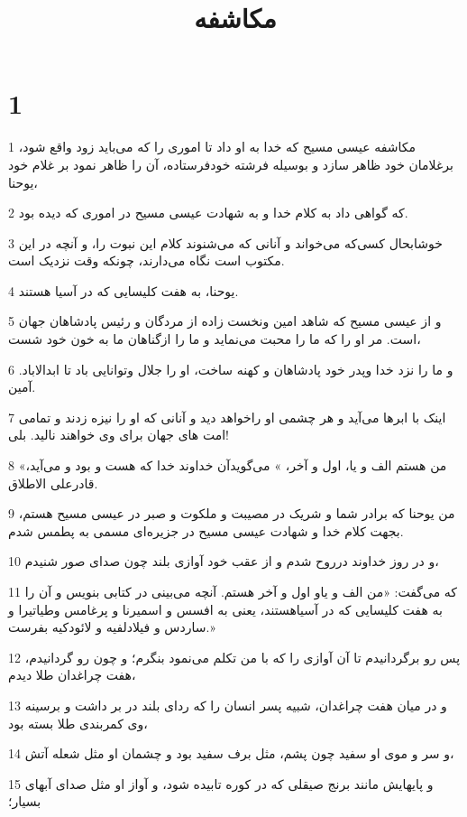 

\title{مکاشفه}


\chapter{1}

\par 1 مکاشفه عیسی مسیح که خدا به او داد تا اموری را که می‌باید زود واقع شود، برغلامان خود ظاهر سازد و بوسیله فرشته خودفرستاده، آن را ظاهر نمود بر غلام خود یوحنا،
\par 2 که گواهی داد به کلام خدا و به شهادت عیسی مسیح در اموری که دیده بود.
\par 3 خوشابحال کسی‌که می‌خواند و آنانی که می‌شنوند کلام این نبوت را، و آنچه در این مکتوب است نگاه می‌دارند، چونکه وقت نزدیک است.
\par 4 یوحنا، به هفت کلیسایی که در آسیا هستند.
\par 5 و از عیسی مسیح که شاهد امین ونخست زاده از مردگان و رئیس پادشاهان جهان است. مر او را که ما را محبت می‌نماید و ما را ازگناهان ما به خون خود شست،
\par 6 و ما را نزد خدا وپدر خود پادشاهان و کهنه ساخت، او را جلال وتوانایی باد تا ابدالاباد. آمین.
\par 7 اینک با ابرها می‌آید و هر چشمی او راخواهد دید و آنانی که او را نیزه زدند و تمامی امت های جهان برای وی خواهند نالید. بلی!
\par 8 «من هستم الف و یا، اول و آخر، » می‌گویدآن خداوند خدا که هست و بود و می‌آید، قادرعلی الاطلاق.
\par 9 من یوحنا که برادر شما و شریک در مصیبت و ملکوت و صبر در عیسی مسیح هستم، بجهت کلام خدا و شهادت عیسی مسیح در جزیره‌ای مسمی به پطمس شدم.
\par 10 و در روز خداوند درروح شدم و از عقب خود آوازی بلند چون صدای صور شنیدم،
\par 11 که می‌گفت: «من الف و یاو اول و آخر هستم. آنچه می‌بینی در کتابی بنویس و آن را به هفت کلیسایی که در آسیاهستند، یعنی به افسس و اسمیرنا و پرغامس وطیاتیرا و ساردس و فیلادلفیه و لائودکیه بفرست.»
\par 12 پس رو برگردانیدم تا آن آوازی را که با من تکلم می‌نمود بنگرم؛ و چون رو گردانیدم، هفت چراغدان طلا دیدم،
\par 13 و در میان هفت چراغدان، شبیه پسر انسان را که ردای بلند در بر داشت و برسینه وی کمربندی طلا بسته بود،
\par 14 و سر و موی او سفید چون پشم، مثل برف سفید بود و چشمان او مثل شعله آتش،
\par 15 و پایهایش مانند برنج صیقلی که در کوره تابیده شود، و آواز او مثل صدای آبهای بسیار؛
